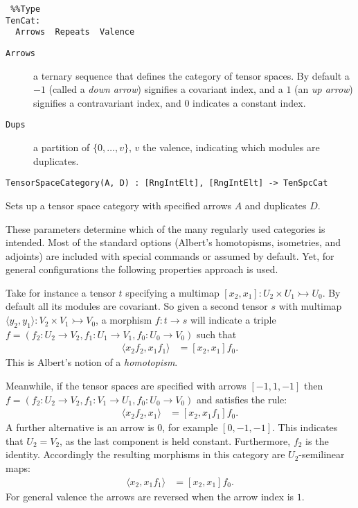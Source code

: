 \documentclass{amsart}
\begin{document}
\color{blue}
{\small \begin{verbatim} %%Type
TenCat:
  Arrows  Repeats  Valence
\end{verbatim} }
\color{black}

\begin{description}
\item[{\tt Arrows}] a ternary sequence  that defines the category of tensor 
spaces. By default a $-1$ (called a {\em down arrow}) signifies a covariant 
index, and a $1$ (an {\em up arrow}) signifies a contravariant  index, and $0$ 
indicates a constant index.
\item[{\tt Dups}] a partition of $\{0,\dots,v\}$, $v$ the valence, indicating 
which modules are duplicates.
\end{description}

\color{blue}
{\small \begin{verbatim}
TensorSpaceCategory(A, D) : [RngIntElt], [RngIntElt] -> TenSpcCat
\end{verbatim} }
\color{black}

Sets up a tensor space category with specified arrows $A$ and duplicates $D$.

These parameters determine which of the many regularly used categories is 
intended. Most of the standard options (Albert's homotopisms, isometries, and 
adjoints) are included with special commands or assumed by default. Yet, for 
general configurations the following properties approach is used.

Take for instance a tensor $t$  specifying a multimap 
$[x_2,x_1]:U_2\times U_1\rightarrowtail U_0$.  By default all its modules are 
covariant. So given a second tensor $s$ with multimap 
$\langle y_2,y_1\rangle:V_2\times V_1\rightarrowtail V_0$, a morphism 
$f:t\to s$ will indicate a triple 
$f=(f_2:U_2\to V_2, f_1:U_1\to V_1,f_0:U_0\to V_0)$ such that
\begin{align*}
	\langle x_2 f_2, x_1 f_1\rangle & = [x_2,x_1]f_0.
\end{align*}
This is Albert's notion of a {\em homotopism}.  

Meanwhile, if the tensor spaces are specified
with arrows $[-1,1,-1]$ then $f=(f_2:U_2\to V_2, f_1:V_1\to U_1,f_0:U_0\to V_0)$ 
and satisfies the rule:
\begin{align*}
	\langle x_2 f_2, x_1\rangle & = [x_2,x_1 f_1]f_0.
\end{align*}
A further alternative is an arrow is $0$, for example $[0,-1,-1]$. This 
indicates that $U_2=V_2$, as the last component is held constant.  Furthermore, 
$f_2$ is the identity.  Accordingly the resulting morphisms in this category are 
$U_2$-semilinear maps:
\begin{align*}
	\langle x_2, x_1 f_1\rangle & = [x_2,x_1]f_0.
\end{align*}
For general valence the arrows are reversed when the arrow index is $1$.
\medskip
\end{document}
